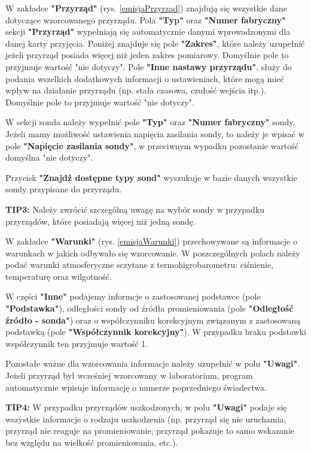 {{{	W zakładce \textbf{"Przyrząd"} (rys. \ref{emisjaPrzyrzad}) znajdują się wszystkie dane dotyczące wzorcowanego przyrządu. Pola \textbf{"Typ"} oraz \textbf{"Numer fabryczny"} sekcji \textbf{"Przyrząd"} wypełniają się automatycznie danymi wprowadzonymi dla danej karty przyjęcia. Poniżej znajduje się pole \textbf{"Zakres"}, które należy uzupełnić jeżeli przyrząd posiada więcej niż jeden zakres pomiarowy. Domyślnie pole to przyjmuje wartość "nie dotyczy". Pole \textbf{"Inne nastawy przyrządu"}, służy do podania wszelkich dodatkowych informacji o ustawieniach, które mogą mieć wpływ na działanie przyrządu (np. stała czasowa, czułość wejścia itp.). Domyślnie pole to przyjmuje wartość "nie dotyczy".
	
	W sekcji sonda należy wypełnić pole \textbf{"Typ"} oraz \textbf{"Numer fabryczny"} sondy. Jeżeli mamy możliwość ustawienia napięcia zasilania sondy, to należy je wpisać w pole \textbf{"Napięcie zasilania sondy"}, w przeciwnym wypadku pozostanie wartość domyślna "nie dotyczy".
	
	Przycisk \textbf{"Znajdź dostępne typy sond"} wyszukuje w bazie danych wszystkie sondy przypisane do przyrządu.
	
	\textbf{TIP3:} Należy zwrócić szczególną uwagę na wybór sondy w przypadku przyrządów, które posiadają więcej niż jedną sondę.
	
	W zakładce \textbf{"Warunki"} (rys. \ref{emisjaWarunki}) przechowywane są informacje o warunkach w jakich odbywało się wzorcowanie. W poszczególnych polach należy podać warunki atmosferyczne sczytane z termohigrobarometru: ciśnienie, temperaturę oraz wilgotność.
	
	W części \textbf{"Inne"} podajemy informcje o zastosowanej podstawce (pole \textbf{"Podstawka"}), odległości sondy od źródła promieniowania (pole \textbf{"Odległość źródło - sonda"}) oraz o współczynniku korekcyjnym związanym z zastosowaną podstawką (pole \textbf{"Współczynnik korekcyjny"}). W przypadku braku podstawki współczynnik ten przyjmuje wartość 1.
	
	Pozostałe ważne dla wzorcowania informacje należy uzupełnić w polu \textbf{"Uwagi"}. Jeżeli przyrząd był wcześniej wzorcowany w laboratorium, program automatycznie wpisuje informację o numerze poprzedniego świadectwa.  
	
	\textbf{TIP4:} W przypadku przyrządów uszkodzonych, w polu \textbf{"Uwagi"} podaje się wszystkie informacje o rodzaju uszkodzenia (np. przyrząd się nie uruchamia, przyrząd nie reaguje na promieniowanie, przyrząd pokazuje to samo wskazanie bez względu na wielkość promieniowania, etc.).
	
}}}
